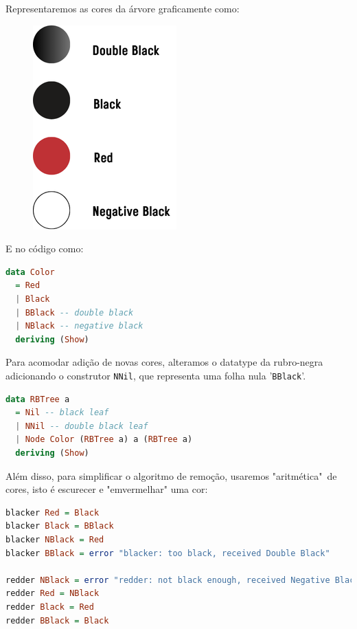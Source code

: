 Representaremos as cores da árvore graficamente como:

\begin{figure}[!ht]
	\centering
	\includegraphics[scale=0.7]{figures/rubro-negra/colors.png}
\end{figure}
\FloatBarrier

E no código como:

\begin{lstlisting}[language=haskell]
data Color
  = Red
  | Black
  | BBlack -- double black
  | NBlack -- negative black
  deriving (Show)
\end{lstlisting}
\FloatBarrier

Para acomodar adição de novas cores, alteramos o datatype da rubro-negra adicionando o construtor \texttt{NNil}, que representa uma folha nula '\texttt{BBlack}'.

\begin{lstlisting}[language=haskell]
data RBTree a
  = Nil -- black leaf
  | NNil -- double black leaf
  | Node Color (RBTree a) a (RBTree a)
  deriving (Show)
\end{lstlisting}
\FloatBarrier

Além disso, para simplificar o algoritmo de remoção, usaremos "aritmética"\ de cores, isto é escurecer e "emvermelhar" uma cor:

\begin{lstlisting}[language=haskell]
blacker Red = Black
blacker Black = BBlack
blacker NBlack = Red
blacker BBlack = error "blacker: too black, received Double Black"

redder NBlack = error "redder: not black enough, received Negative Black"
redder Red = NBlack
redder Black = Red
redder BBlack = Black
\end{lstlisting}
\FloatBarrier



